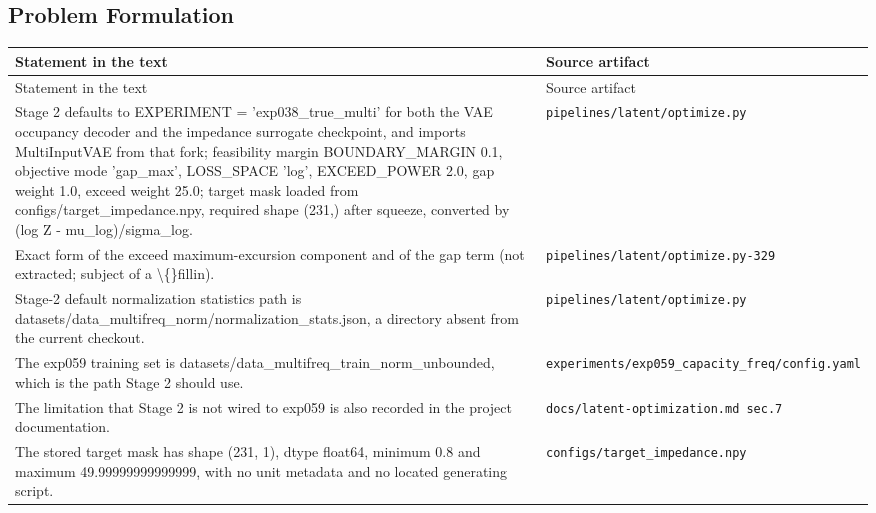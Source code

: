 \subsection*{Problem Formulation}
\begingroup\small
\begin{longtable}{p{} p{}}
\hline
Statement in the text & Source artifact \\
\hline
\endfirsthead
\hline
Statement in the text & Source artifact \\
\hline
\endhead
Stage 2 defaults to EXPERIMENT = 'exp038\_true\_multi' for both the VAE occupancy decoder and the impedance surrogate checkpoint, and imports MultiInputVAE from that fork; feasibility margin BOUNDARY\_MARGIN 0.1, objective mode 'gap\_max', LOSS\_SPACE 'log', EXCEED\_POWER 2.0, gap weight 1.0, exceed weight 25.0; target mask loaded from configs/target\_impedance.npy, required shape (231,) after squeeze, converted by (log Z - mu\_log)/sigma\_log. & \texttt{pipelines/\allowbreak{}latent/\allowbreak{}optimize.py} \\
Exact form of the exceed maximum-excursion component and of the gap term (not extracted; subject of a \textbackslash\{\}fillin). & \texttt{pipelines/\allowbreak{}latent/\allowbreak{}optimize.py-329} \\
Stage-2 default normalization statistics path is datasets/data\_multifreq\_norm/normalization\_stats.json, a directory absent from the current checkout. & \texttt{pipelines/\allowbreak{}latent/\allowbreak{}optimize.py} \\
The exp059 training set is datasets/data\_multifreq\_train\_norm\_unbounded, which is the path Stage 2 should use. & \texttt{experiments/\allowbreak{}exp059\_\allowbreak{}capacity\_\allowbreak{}freq/\allowbreak{}config.yaml} \\
The limitation that Stage 2 is not wired to exp059 is also recorded in the project documentation. & \texttt{docs/\allowbreak{}latent-optimization.md sec.7} \\
The stored target mask has shape (231, 1), dtype float64, minimum 0.8 and maximum 49.99999999999999, with no unit metadata and no located generating script. & \texttt{configs/\allowbreak{}target\_\allowbreak{}impedance.npy} \\
\hline
\end{longtable}
\endgroup

